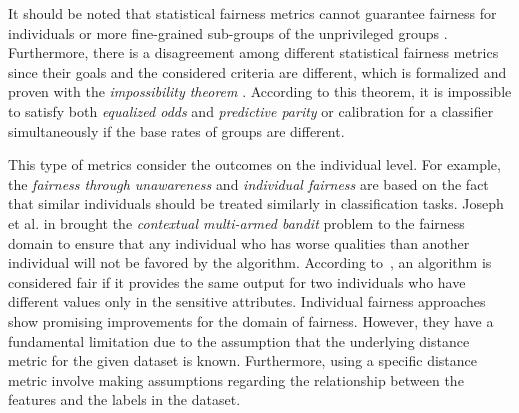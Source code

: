It should be noted that statistical fairness metrics cannot guarantee fairness for individuals or more fine-grained sub-groups of the unprivileged  groups \cite{chouldechova2018frontiers}. Furthermore, there is a disagreement among different statistical fairness metrics since their goals and the considered criteria are different, which is formalized and proven with the \emph{impossibility theorem} \cite{chouldechova2017fair,kleinberg2017inherent,pleiss2017calibration}. According to this theorem, it is impossible to satisfy both \emph{equalized odds} and  \emph{predictive parity} or calibration for a classifier simultaneously if the base rates of groups are different. 



 This type of metrics consider the outcomes on the individual level. For example, the  \emph{fairness through unawareness} \cite{kusner2017counterfactual} and \emph{individual fairness} \cite{dwork2012fairness} are based on the fact that similar individuals should be treated similarly in classification tasks. Joseph et al. in  \cite{joseph2016fairness_qualified} brought the \emph{contextual multi-armed bandit} problem to the fairness domain to ensure that any individual who has worse qualities than another individual will not be favored by the algorithm. According to~\cite{galhotra2017causal_discr}, an algorithm is considered fair if it provides the same output for two individuals who have different values only in the sensitive attributes.
Individual fairness approaches show promising improvements for the domain of fairness. However, they have a fundamental limitation due to the assumption that the underlying distance metric for the given dataset is known. Furthermore, using a specific distance metric involve making assumptions regarding the relationship between the features and the labels in the dataset.

